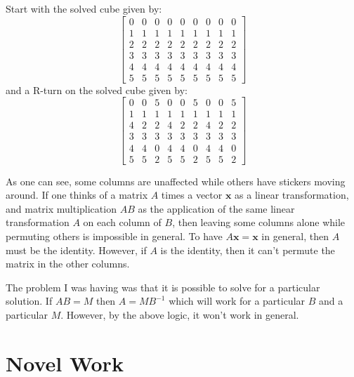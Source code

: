 \documentclass[11pt, oneside]{article}
\newcommand{\ve}[1]{\mathbf{#1}}
\theoremstyle{plain}
\begin{document}
Start with the solved cube given by:
\[ \begin{bmatrix}
0 & 0 & 0 & 0 & 0 & 0 & 0 & 0 & 0 \\
1 & 1 & 1 & 1 & 1 & 1 & 1 & 1 & 1 \\
2 & 2 & 2 & 2 & 2 & 2 & 2 & 2 & 2 \\
3 & 3 & 3 & 3 & 3 & 3 & 3 & 3 & 3 \\
4 & 4 & 4 & 4 & 4 & 4 & 4 & 4 & 4 \\
5 & 5 & 5 & 5 & 5 & 5 & 5 & 5 & 5
\end{bmatrix} \]
and a R-turn on the solved cube given by:
\[ \begin{bmatrix}
0 & 0 & 5 & 0 & 0 & 5 & 0 & 0 & 5 \\
1 & 1 & 1 & 1 & 1 & 1 & 1 & 1 & 1 \\
4 & 2 & 2 & 4 & 2 & 2 & 4 & 2 & 2 \\
3 & 3 & 3 & 3 & 3 & 3 & 3 & 3 & 3 \\
4 & 4 & 0 & 4 & 4 & 0 & 4 & 4 & 0 \\
5 & 5 & 2 & 5 & 5 & 2 & 5 & 5 & 2
\end{bmatrix} \]

As one can see, some columns are unaffected while others have stickers moving
around. If one thinks of a matrix \( A \) times a vector \( \ve{x} \) as a
linear transformation, and matrix multiplication \( AB \) as the application
of the same linear transformation \( A \) on each column of \( B \), then
leaving some columns alone while permuting others is impossible in general.
To have \( A\ve{x} = \ve{x} \) in general, then \( A \) must be the identity.
However, if \( A \) is the identity, then it can't permute the matrix in the
other columns.

The problem I was having was that it is possible to solve for
a particular solution. If \( AB = M \) then \( A = MB^{-1} \)
which will work for a particular \( B \) and a particular \( M
\). However, by the above logic, it won't work in general.

\section{Novel Work}
\end{document}
